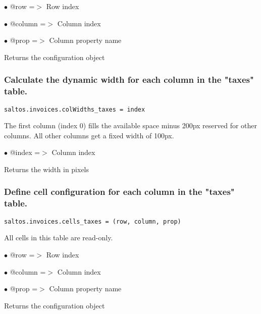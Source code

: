\documentclass[a4paper]{article}
\begin{document}
\begin{compactitem}
\item[\color{myblue}$\bullet$] @row    =$>$ Row index
\item[\color{myblue}$\bullet$] @column =$>$ Column index
\item[\color{myblue}$\bullet$] @prop   =$>$ Column property name
\end{compactitem}

Returns the configuration object

\hypertarget{toc159}{}
\subsubsection{Calculate the dynamic width for each column in the "taxes" table.}

\begin{lstlisting}
saltos.invoices.colWidths_taxes = index
\end{lstlisting}

The first column (index 0) fills the available space minus 200px reserved for other columns.
All other columns get a fixed width of 100px.

\begin{compactitem}
\item[\color{myblue}$\bullet$] @index =$>$ Column index
\end{compactitem}

Returns the width in pixels

\hypertarget{toc160}{}
\subsubsection{Define cell configuration for each column in the "taxes" table.}

\begin{lstlisting}
saltos.invoices.cells_taxes = (row, column, prop)
\end{lstlisting}

All cells in this table are read-only.

\begin{compactitem}
\item[\color{myblue}$\bullet$] @row    =$>$ Row index
\item[\color{myblue}$\bullet$] @column =$>$ Column index
\item[\color{myblue}$\bullet$] @prop   =$>$ Column property name
\end{compactitem}

Returns the configuration object
\end{document}
